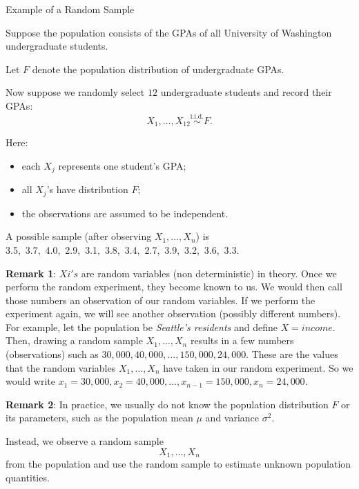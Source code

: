 \begin{frame}{Example of a Random Sample}

\small

Suppose the population consists of the GPAs of all University of Washington undergraduate students.

Let \(F\) denote the population distribution of undergraduate GPAs.

Now suppose we randomly select \(12\) undergraduate students and record their GPAs:
\[
X_1,\dots,X_{12}
\overset{\text{i.i.d.}}{\sim}
F.
\]

Here:
\begin{itemize}
\item each \(X_j\) represents one student's GPA;
\item all \(X_j\)'s have distribution \(F\);
\item the observations are assumed to be independent.
\end{itemize}

A possible sample (after observing $X_1,\dots ,X_n$) is 3.5,\ 3.7,\ 4.0,\ 2.9,\ 3.1,\ 3.8,\ 3.4,\ 2.7,\ 3.9,\ 3.2,\ 3.6,\ 3.3.
 
\textbf{Remark 1}: $Xi's$ are random variables (non deterministic) in theory. Once we perform the random experiment, they become known to us. We would then call those numbers an observation of our random variables. If we perform the experiment again, we will see another observation (possibly different numbers). For example, let the population be \textit{Seattle's residents} and define $X=income$. Then, drawing a random sample $X_1,\dots, X_n$   results in a few numbers (observations) such as $30,000, 40,000, \dots, 150,000, 24,000$. These are the values that the random variables $X_1,\dots ,X_n$ have taken in our random experiment. So we would write $x_1=30,000, x_2 = 40,000, \dots, x_{n-1}=150,000, x_n = 24,000$.

\textbf{Remark 2}:
In practice, we usually do not know the population distribution \(F\) or its parameters, such as the population mean \(\mu\) and variance \(\sigma^2\).

Instead, we observe a random sample
\[
X_1,\dots,X_n
\]
from the population and use the random sample to estimate unknown population quantities.
 

\end{frame}





